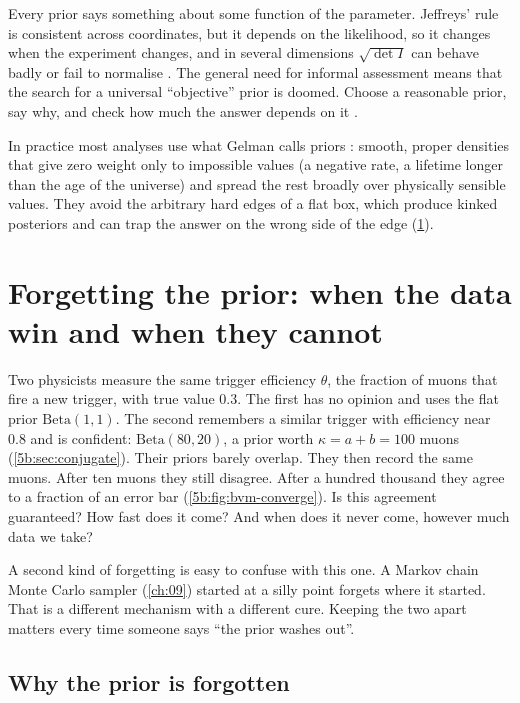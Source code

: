\begin{pitfall}
Every prior says something about some function of the parameter. Jeffreys' rule is
consistent across coordinates, but it depends on the likelihood, so it changes when
the experiment changes, and in several dimensions $\sqrt{\det I}$ can behave badly or
fail to normalise . The general need for informal assessment
means that the search for a universal ``objective'' prior is doomed. Choose a
reasonable prior, say why, and check how much the answer depends on it
.
\end{pitfall}

In practice most analyses use what Gelman calls  priors
: smooth, proper densities that give zero weight only to
impossible values (a negative rate, a lifetime longer than the age of the universe) and
spread the rest broadly over physically sensible values. They avoid the arbitrary hard
edges of a flat box, which produce kinked posteriors and can trap the answer on the
wrong side of the edge (\cref{5b:sec:bvm}).
\section{Forgetting the prior: when the data win and when they cannot}
\label{5b:sec:bvm}

Two physicists measure the same trigger efficiency $\theta$, the fraction of muons that
fire a new trigger, with true value $0.3$. The first has no opinion and uses the flat
prior $\mathrm{Beta}(1,1)$. The second remembers a similar trigger with efficiency near
$0.8$ and is confident: $\mathrm{Beta}(80,20)$, a prior worth $\kappa=a+b=100$ muons
(\cref{5b:sec:conjugate}). Their priors barely overlap. They then record the same muons.
After ten muons they still disagree. After a hundred thousand they agree to a fraction of
an error bar (\cref{5b:fig:bvm-converge}). Is this agreement guaranteed? How fast does it
come? And when does it never come, however much data we take?

A second kind of forgetting is easy to confuse with this one. A Markov chain Monte
Carlo sampler (\cref{ch:09}) started at a silly point forgets where it started. That is
a different mechanism with a different cure. Keeping the two apart matters every time
someone says ``the prior washes out''.

\subsection{Why the prior is forgotten}

